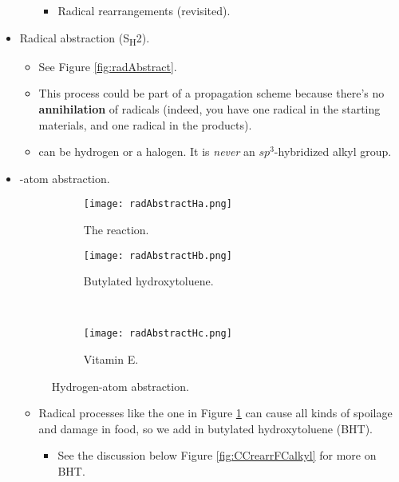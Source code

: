 \documentclass[../notes.tex]{subfiles}
\begin{document}
\begin{itemize}
\begin{enumerate}[label={\Alph*.},start=2]
\begin{itemize}
            \item Radical rearrangements (revisited).
        \end{itemize}
    \end{enumerate}
    \item Radical abstraction (S\textsubscript{H}2).
    \begin{itemize}
        \item See Figure \ref{fig:radAbstract}.
        \item This process could be part of a propagation scheme because there's no \textbf{annihilation} of radicals (indeed, you have one radical in the starting materials, and one radical in the products).
        \item {} can be hydrogen or a halogen. It is \emph{never} an $sp^3$-hybridized alkyl group.
    \end{itemize}
    \item {}-atom abstraction.
    \begin{figure}[H]
        \centering
        \begin{subfigure}[b]{0.49\linewidth}
            \centering
            \texttt{[image: radAbstractHa.png]}
            \caption{The reaction.}
            \label{fig:radAbstractHa}
        \end{subfigure}
        \begin{subfigure}[b]{0.49\linewidth}
            \centering
            \texttt{[image: radAbstractHb.png]}
            \caption{Butylated hydroxytoluene.}
            \label{fig:radAbstractHb}
        \end{subfigure}\\[2em]
        \begin{subfigure}[b]{0.3\linewidth}
            \centering
            \texttt{[image: radAbstractHc.png]}
            \caption{Vitamin E.}
            \label{fig:radAbstractHc}
        \end{subfigure}
        \caption{Hydrogen-atom abstraction.}
        \label{fig:radAbstractH}
    \end{figure}
    \begin{itemize}
        \item Radical processes like the one in Figure \ref{fig:radAbstractHa} can cause all kinds of spoilage and damage in food, so we add in butylated hydroxytoluene (BHT).
        \begin{itemize}
            \item See the discussion below Figure \ref{fig:CCrearrFCalkyl} for more on BHT.

\end{itemize}
\end{itemize}
\end{itemize}
\end{document}
